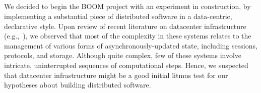 
% 
% 

\subsection{\BOOMA}
We decided to begin the BOOM project with an experiment in construction, by implementing a substantial piece of
distributed software in a data-centric, declarative style. Upon review of recent literature on
datacenter infrastructure (e.g.,~\cite{chubby,gfs-sosp,dynamo,mapreduce-osdi}),
we observed that most of the complexity in these systems relates to the
management of various forms of asynchronously-updated state, including sessions,
protocols, and storage. Although quite complex, few of these systems involve intricate, uninterrupted
sequences of computational steps. Hence, we suspected that datacenter
infrastructure might be a good initial litmus test for our hypotheses about building distributed software.

